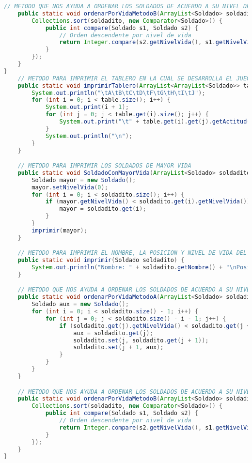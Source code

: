 \documentclass{article}
\begin{document}
\begin{itemize}
\begin{lstlisting}[language=java]
    // METODO QUE NOS AYUDA A ORDENAR LOS SOLDADOS DE ACUERDO A SU NIVEL DE VIDA, EN ESTA OCACION DIFERENTE A LA ANTERIOR QUE ERA ALGORITMO DE BURBUJA
    public static void ordenarPorVidaMetodoB(ArrayList<Soldado> soldadito) {
        Collections.sort(soldadito, new Comparator<Soldado>() {
            public int compare(Soldado s1, Soldado s2) {
                // Orden descendente por nivel de vida
                return Integer.compare(s2.getNivelVida(), s1.getNivelVida());
            }
        });
    }
}
    // METODO PARA IMPRIMIR EL TABLERO EN LA CUAL SE DESARROLLA EL JUEGO
    public static void imprimirTablero(ArrayList<ArrayList<Soldado>> table) {
        System.out.println("\tA\tB\tC\tD\tF\tG\tH\tI\tJ");
        for (int i = 0; i < table.size(); i++) {
            System.out.print(i + 1);
            for (int j = 0; j < table.get(i).size(); j++) {
                System.out.print("\t" + table.get(i).get(j).getActitud());
            }
            System.out.println("\n");
        }
    }

    // METODO PARA IMPRIMIR LOS SOLDADOS DE MAYOR VIDA
    public static void SoldadoConMayorVida(ArrayList<Soldado> soldadito) {
        Soldado mayor = new Soldado();
        mayor.setNivelVida(0);
        for (int i = 0; i < soldadito.size(); i++) {
            if (mayor.getNivelVida() < soldadito.get(i).getNivelVida()) {
                mayor = soldadito.get(i);
            }
        }
        imprimir(mayor);
    }

    // METODO PARA IMPRIMIR EL NOMBRE, LA POSICION Y NIVEL DE VIDA DEL SOLDADO
    public static void imprimir(Soldado soldadito) {
        System.out.println("Nombre: " + soldadito.getNombre() + "\nPosicion: " + soldadito.getColumna() + "X" + soldadito.getFila() + "\tVida: " + soldadito.getNivelVida());
    }

    // METODO QUE NOS AYUDA A ORDENAR LOS SOLDADOS DE ACUERDO A SU NIVEL DE VIDA, USUANDO UN ALGORITMO DE ORDENAMIENTO DE BURBUJA
    public static void ordenarPorVidaMetodoA(ArrayList<Soldado> soldadito) {
        Soldado aux = new Soldado();
        for (int i = 0; i < soldadito.size() - 1; i++) {
            for (int j = 0; j < soldadito.size() - i - 1; j++) {
                if (soldadito.get(j).getNivelVida() < soldadito.get(j + 1).getNivelVida()) {
                    aux = soldadito.get(j);
                    soldadito.set(j, soldadito.get(j + 1));
                    soldadito.set(j + 1, aux);
                }
            }
        }
    }

    // METODO QUE NOS AYUDA A ORDENAR LOS SOLDADOS DE ACUERDO A SU NIVEL DE VIDA, EN ESTA OCACION DIFERENTE A LA ANTERIOR QUE ERA ALGORITMO DE BURBUJA
    public static void ordenarPorVidaMetodoB(ArrayList<Soldado> soldadito) {
        Collections.sort(soldadito, new Comparator<Soldado>() {
            public int compare(Soldado s1, Soldado s2) {
                // Orden descendente por nivel de vida
                return Integer.compare(s2.getNivelVida(), s1.getNivelVida());
            }
        });
    }
}
        \end{lstlisting}


\end{itemize}
\end{document}
